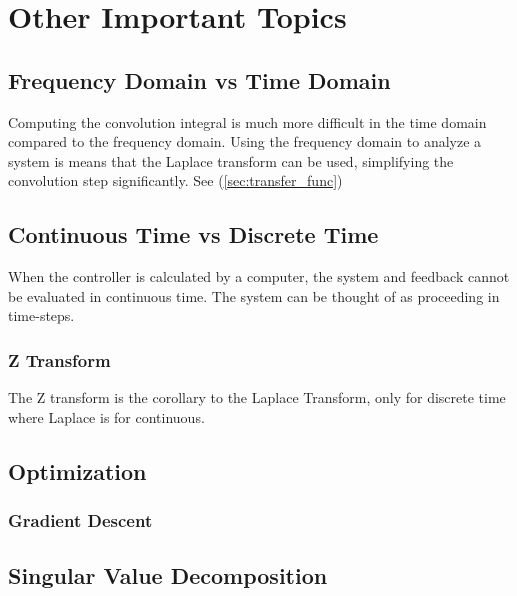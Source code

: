 \documentclass[../notes.tex]{subfiles}
\begin{document}
\section{Other Important Topics}
\subsection{Frequency Domain vs Time Domain}
Computing the convolution integral is much more difficult in the time domain compared to the frequency domain. Using the frequency domain to analyze a system is means that the Laplace transform can be used, simplifying the convolution step significantly. See (\underline{\ref{sec:transfer_func}})

\subsection{Continuous Time vs Discrete Time}
When the controller is calculated by a computer, the system and feedback cannot be evaluated in continuous time. The system can be thought of as proceeding in time-steps.

\subsubsection{Z Transform}
The Z transform is the corollary to the Laplace Transform, only for discrete time where Laplace is for continuous.

\subsection{Optimization}
\subsubsection{Gradient Descent}

\subsection{Singular Value Decomposition}
\end{document}
